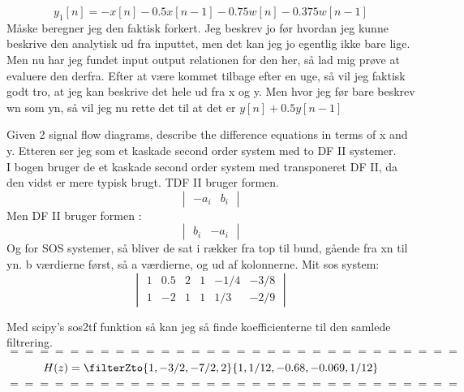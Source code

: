 \begin{Opgaver}
\begin{kapitel}
\begin{Opgave}[Opgave 9.28]
            \[y_1[n] = - x[n] - 0.5x[n - 1] - 0.75w[n] - 0.375w[n - 1]\]
            Måske beregner jeg den faktisk forkert. Jeg beskrev jo før hvordan jeg kunne beskrive den analytisk ud fra inputtet, men det kan jeg jo egentlig ikke bare lige. 
            Men nu har jeg fundet input output relationen for den her, så lad mig prøve at evaluere den derfra. 
            \color{red} Efter at være kommet tilbage efter en uge, så vil jeg faktisk godt tro, at jeg kan beskrive det hele ud fra x og y. 
            Men hvor jeg før bare beskrev wn som yn, så vil jeg nu rette det til at det er $y[n] + 0.5y[n - 1]$
            \color{black}

        \end{Opgave}
        \begin{Opgave}
            Given 2 signal flow diagrams, describe the difference equations in terms of x and y. 
            Etteren ser jeg som et kaskade second order system med to DF II systemer.\\
            I bogen bruger de et kaskade second order system med transponeret DF II, da den vidst er mere typisk brugt. 
            TDF II bruger formen. 
            \[\begin{vmatrix}
                -a_i & b_i
            \end{vmatrix}\]
            Men DF II bruger formen :
            \[\begin{vmatrix}
                b_i & -a_i
            \end{vmatrix}\]
            Og for SOS systemer, så bliver de sat i rækker fra top til bund, gående fra xn til yn. b værdierne først, så a værdierne, og ud af kolonnerne. 
            Mit sos system: 
            \[\begin{vmatrix}
                1 & 0.5 & 2 & 1 & -1/4 & -3/8 \\
                1 &  -2 & 1 & 1 &  1/3 & -2/9
            \end{vmatrix}\]

            Med scipy's sos2tf funktion så kan jeg så finde koefficienterne til den samlede filtrering.
            \[==============================\]
            \[H(z) = \filterZto{1, -3/2, -7/2, 2}{1, 1/12, -0.68, -0.069, 1/12}\]
            \[==============================\]\\\\\\ 
            

\end{Opgave}
\end{kapitel}
\end{Opgaver}
